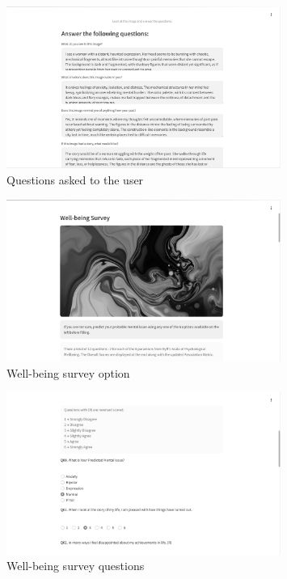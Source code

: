 \begin{figure}[h!]  
    \centering
    \includegraphics[width=0.8\textwidth]{App Images/27 Interface.png}  
    \caption{Questions asked to the user}
    \label{10i23445}  %
\end{figure} 

\begin{figure}[h!]  
    \centering
    \includegraphics[width=0.8\textwidth]{App Images/28 Interface.png}  
    \caption{Well-being survey option}
    \label{10i23445}  %
\end{figure} 

\pagebreak

\begin{figure}[h!]  
    \centering
    \includegraphics[width=0.8\textwidth]{App Images/29 Interface.png}  
    \caption{Well-being survey questions}
    \label{10i23445}  %
\end{figure} 

